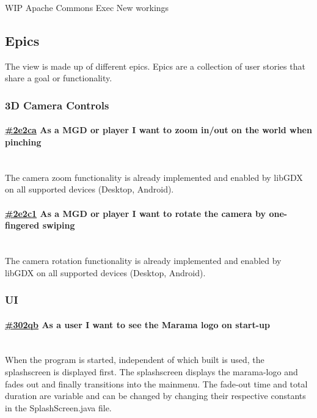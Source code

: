 \documentclass[10pt]{extarticle} %
\newcommand{\myparagraph}[1]{\paragraph{#1}\mbox{}\\} %
\begin{document}
    WIP
    Apache Commons Exec
    New workings

    \subsection{Epics}
    \label{subsec:epics}
    The view is made up of different epics.
    Epics are a collection of user stories that share a goal or functionality.

    \newcommand{\clickup}[1]{https://app.clickup.com/757520/761304/t/#1}

    \subsubsection{3D Camera Controls}
    \myparagraph{\href{\clickup{2e2ca}}{\#2e2ca} As a MGD or player I want to zoom in/out on the world when pinching}
    The camera zoom functionality is already implemented and enabled by libGDX on all supported devices (Desktop, Android).
    \myparagraph{\href{\clickup{2e2c1}}{\#2e2c1} As a MGD or player I want to rotate the camera by one-fingered swiping}
    The camera rotation functionality is already implemented and enabled by libGDX on all supported devices (Desktop, Android).

    \subsubsection{UI}
    \myparagraph{\href{\clickup{302qb}}{\#302qb} As a user I want to see the Marama logo on start-up}
    When the program is started, independent of which built is used, the splashscreen is displayed first.
    The splashscreen displays the marama-logo and fades out and finally transitions into the mainmenu.
    The fade-out time and total duration are variable and can be changed by changing their respective constants in the SplashScreen.java file.
\end{document}
